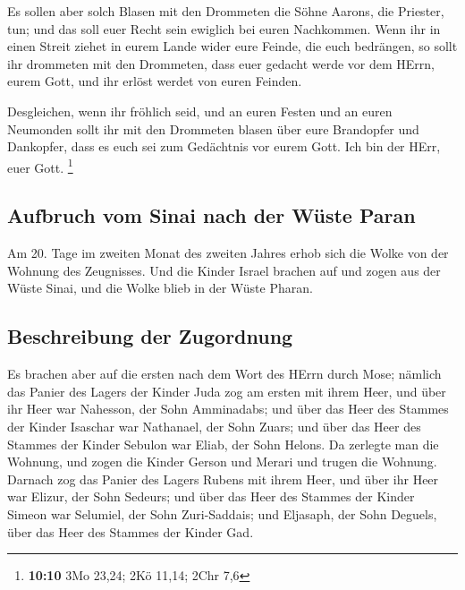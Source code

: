  Es sollen aber solch Blasen mit den Drommeten die Söhne
Aarons, die Priester, tun; und das soll euer Recht sein ewiglich bei
euren Nachkommen.  Wenn ihr in einen Streit ziehet in
eurem Lande wider eure Feinde, die euch bedrängen, so sollt ihr
drommeten mit den Drommeten, dass euer gedacht werde vor dem HErrn,
eurem Gott, und ihr erlöst werdet von euren Feinden.

 Desgleichen, wenn ihr fröhlich seid, und an euren Festen
und an euren Neumonden sollt ihr mit den Drommeten blasen über eure
Brandopfer und Dankopfer, dass es euch sei zum Gedächtnis vor eurem
Gott. Ich bin der HErr, euer Gott. \footnote{\textbf{10:10} 3Mo 23,24;
  2Kö 11,14; 2Chr 7,6}

\hypertarget{aufbruch-vom-sinai-nach-der-wuxfcste-paran}{%
\subsection{Aufbruch vom Sinai nach der Wüste
Paran}\label{aufbruch-vom-sinai-nach-der-wuxfcste-paran}}

 Am 20. Tage im zweiten Monat des zweiten Jahres erhob
sich die Wolke von der Wohnung des Zeugnisses.  Und die
Kinder Israel brachen auf und zogen aus der Wüste Sinai, und die Wolke
blieb in der Wüste Pharan.

\hypertarget{beschreibung-der-zugordnung}{%
\subsection{Beschreibung der
Zugordnung}\label{beschreibung-der-zugordnung}}

 Es brachen aber auf die ersten nach dem Wort des HErrn
durch Mose;  nämlich das Panier des Lagers der Kinder
Juda zog am ersten mit ihrem Heer, und über ihr Heer war Nahesson, der
Sohn Amminadabs;  und über das Heer des Stammes der
Kinder Isaschar war Nathanael, der Sohn Zuars;  und über
das Heer des Stammes der Kinder Sebulon war Eliab, der Sohn Helons.
 Da zerlegte man die Wohnung, und zogen die Kinder Gerson
und Merari und trugen die Wohnung.  Darnach zog das
Panier des Lagers Rubens mit ihrem Heer, und über ihr Heer war Elizur,
der Sohn Sedeurs;  und über das Heer des Stammes der
Kinder Simeon war Selumiel, der Sohn Zuri-Saddais;  und
Eljasaph, der Sohn Deguels, über das Heer des Stammes der Kinder Gad.

